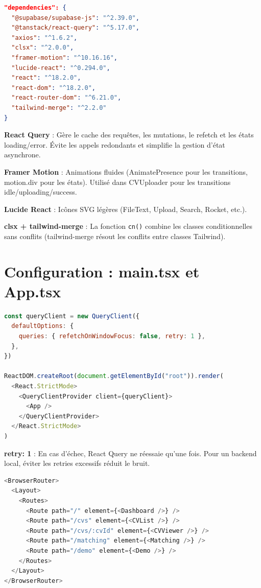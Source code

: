 \documentclass[11pt,a4paper]{report}
\begin{document}
\begin{lstlisting}[caption={Dépendances principales du frontend}, language=JSON]
"dependencies": {
  "@supabase/supabase-js": "^2.39.0",
  "@tanstack/react-query": "^5.17.0",
  "axios": "^1.6.2",
  "clsx": "^2.0.0",
  "framer-motion": "^10.16.16",
  "lucide-react": "^0.294.0",
  "react": "^18.2.0",
  "react-dom": "^18.2.0",
  "react-router-dom": "^6.21.0",
  "tailwind-merge": "^2.2.0"
}
\end{lstlisting}

\textbf{React Query} : Gère le cache des requêtes, les mutations, le refetch et les états loading/error. Évite les appels redondants et simplifie la gestion d'état asynchrone.

\textbf{Framer Motion} : Animations fluides (AnimatePresence pour les transitions, motion.div pour les états). Utilisé dans CVUploader pour les transitions idle/uploading/success.

\textbf{Lucide React} : Icônes SVG légères (FileText, Upload, Search, Rocket, etc.).

\textbf{clsx + tailwind-merge} : La fonction \texttt{cn()} combine les classes conditionnelles sans conflits (tailwind-merge résout les conflits entre classes Tailwind).

\section{Configuration : main.tsx et App.tsx}

\begin{lstlisting}[caption={main.tsx — QueryClient et rendu}, language=JavaScript]
const queryClient = new QueryClient({
  defaultOptions: {
    queries: { refetchOnWindowFocus: false, retry: 1 },
  },
})

ReactDOM.createRoot(document.getElementById("root")).render(
  <React.StrictMode>
    <QueryClientProvider client={queryClient}>
      <App />
    </QueryClientProvider>
  </React.StrictMode>
)
\end{lstlisting}

\textbf{retry: 1} : En cas d'échec, React Query ne réessaie qu'une fois. Pour un backend local, éviter les retries excessifs réduit le bruit.

\begin{lstlisting}[caption={App.tsx — Routes}, language=JavaScript]
<BrowserRouter>
  <Layout>
    <Routes>
      <Route path="/" element={<Dashboard />} />
      <Route path="/cvs" element={<CVList />} />
      <Route path="/cvs/:cvId" element={<CVViewer />} />
      <Route path="/matching" element={<Matching />} />
      <Route path="/demo" element={<Demo />} />
    </Routes>
  </Layout>
</BrowserRouter>
\end{lstlisting}
\end{document}
